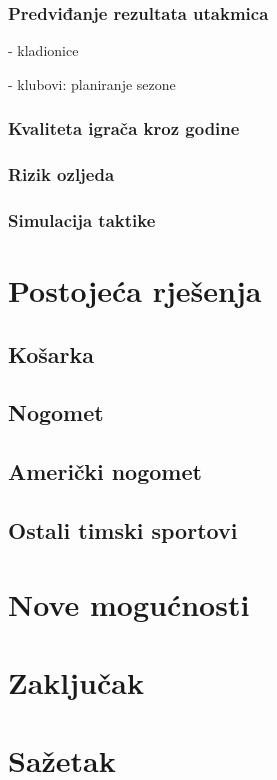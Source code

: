 \documentclass{ferseminar}
\begin{document}
\subsubsection{Predviđanje rezultata utakmica}
- kladionice

- klubovi: planiranje sezone

\subsubsection{Kvaliteta igrača kroz godine}

\subsubsection{Rizik ozljeda}

\subsubsection{Simulacija taktike}

\section{Postojeća rješenja}

\subsection{Košarka}

\subsection{Nogomet}

\subsection{Američki nogomet}

\subsection{Ostali timski sportovi}

\section{Nove mogućnosti}
\section{Zaključak}
\section{Sažetak}
\end{document}
